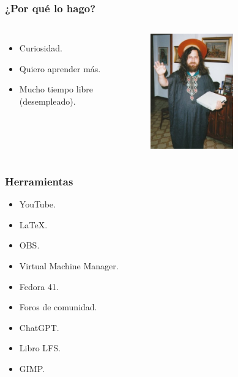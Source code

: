 \documentclass{beamer}
\begin{document}
\begin{frame}
  \frametitle{¿Por qué lo hago?}
  \begin{columns}
    \begin{itemize}
      \item Curiosidad.
      \item Quiero aprender más.
      \item Mucho tiempo libre (desempleado).
    \end{itemize}

    \begin{figure}
      \centering
      \includegraphics[width=0.6\textwidth]{img/saintignucius.jpg}
    \end{figure}
  \end{columns}

\end{frame}

\begin{frame}
  \frametitle{Herramientas}
  \begin{itemize}
    \item YouTube.
    \item LaTeX.
    \item OBS.
    \item Virtual Machine Manager.
    \item Fedora 41.
    \item Foros de comunidad.
    \item ChatGPT.
    \item Libro LFS.
    \item GIMP.
  \end{itemize}

\end{frame}
\end{document}
